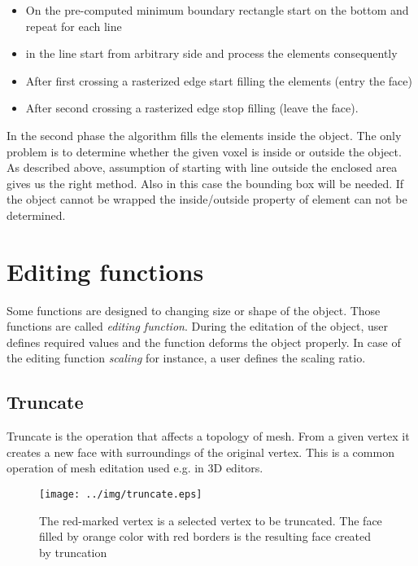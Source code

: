 \begin{itemize}
\item On the pre-computed minimum boundary rectangle start on the bottom and repeat for each line
\item in the line start from arbitrary side and process the elements consequently
\item After first crossing a rasterized edge start filling the elements (entry the face)
\item After second crossing a rasterized edge stop filling (leave the face).

\end{itemize}

In the second phase the algorithm fills the elements inside the object. The only problem is to
determine whether the given voxel is inside or outside the object. As described above, assumption of
starting with line outside the enclosed area gives us the right method. Also in this case the
bounding box will be needed. If the object cannot be wrapped the inside/outside property of element can 
not be determined.

\section{Editing functions}

Some functions are designed to changing size or shape of the object. Those functions are called 
\emph{editing function}.
During the editation of the object, user defines required values and the function deforms the
object properly. In case of the editing function \emph{scaling} for instance, a user defines the scaling
ratio.

\subsection{Truncate}

Truncate is the operation that affects a topology of mesh. From a given vertex it creates a new face with
surroundings of the original vertex. This is a common operation of mesh editation used e.g. in
3D editors.\\

\begin{figure}[ht]
\centering
\texttt{[image: ../img/truncate.eps]}
\caption{The red-marked vertex is a selected vertex to be truncated.
The face filled by orange color with red borders is the resulting face created by truncation}
\end{figure}


